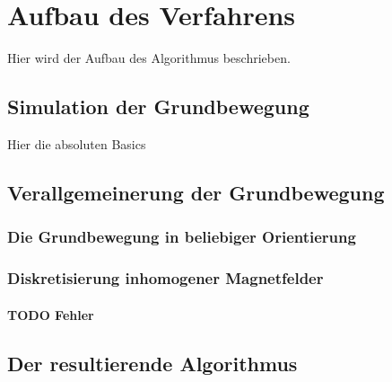 \chapter{Aufbau des Verfahrens}

Hier wird der Aufbau des Algorithmus beschrieben.

\section{Simulation der Grundbewegung}

Hier die absoluten Basics

\section{Verallgemeinerung der Grundbewegung}

\subsection{Die Grundbewegung in beliebiger Orientierung}

\subsection{Diskretisierung inhomogener Magnetfelder}

\subsubsection{TODO Fehler}

\section{Der resultierende Algorithmus}
